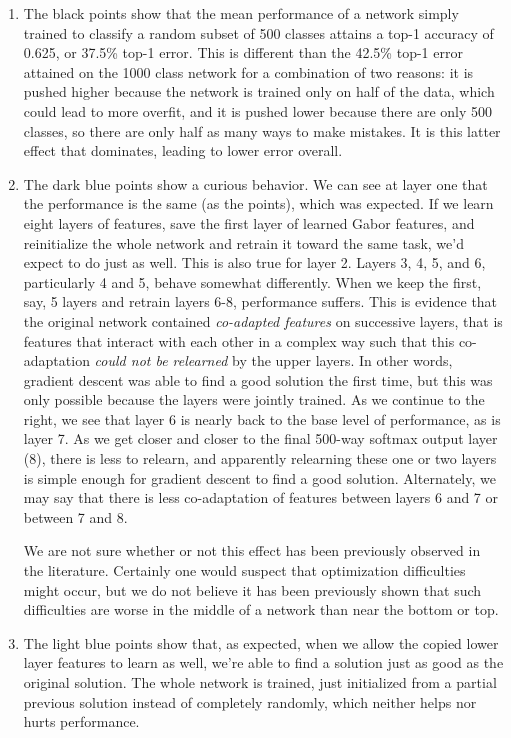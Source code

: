 \begin{enumerate}

\item The black  points show that the mean performance of a network simply trained to classify a random subset of 500 classes attains a top-1 accuracy of 0.625, or 37.5\% top-1 error. This is different than the 42.5\% top-1 error attained on the 1000 class network for a combination of two reasons: it is pushed higher because the network is trained only on half of the data, which could lead to more overfit, and it is pushed lower because there are only 500 classes, so there are only half as many ways to make mistakes. It is this latter effect that dominates, leading to lower error overall.

\item The dark blue  points show a curious behavior. We can see at layer one that the performance is the same (as the  points), which was expected. If we learn eight layers of features, save the first layer of learned Gabor features, and reinitialize the whole network and retrain it toward the same task, we'd expect to do just as well. This is also true for layer 2. Layers 3, 4, 5, and 6, particularly 4 and 5, behave somewhat differently. When we keep the first, say, 5 layers and retrain layers 6-8, performance suffers. This is evidence that the original network contained \emph{co-adapted features} on successive layers, that is features that interact with each other in a complex way such that this co-adaptation \emph{could not be relearned} by the upper layers. In other words, gradient descent was able to find a good solution the first time, but this was only possible because the layers were jointly trained. As we continue to the right, we see that layer 6 is nearly back to the base level of performance, as is layer 7. As we get closer and closer to the final 500-way softmax output layer (8), there is less to relearn, and apparently relearning these one or two layers is simple enough for gradient descent to find a good solution. Alternately, we may say that there is less co-adaptation of features between layers 6 and 7 or between 7 and 8.

We are not sure whether or not this effect has been previously observed in the literature. Certainly one would suspect that optimization difficulties might occur, but we do not believe it has been previously shown that such difficulties are worse in the middle of a network than near the bottom or top.

\item The light blue  points show that, as expected, when we allow the copied lower layer features to learn as well, we're able to find a solution just as good as the original solution. The whole network is trained, just initialized from a partial previous solution instead of completely randomly, which neither helps nor hurts performance.


\end{enumerate}
